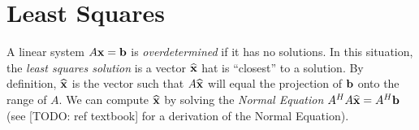 \section*{Least Squares}

A linear system $A{\bf x}={\bf b}$ is \emph{overdetermined} if it has no solutions. 
In this situation, the \emph{least squares solution} is a vector $\widehat{{\bf x}}$ hat is ``closest'' to a solution. 
By definition, $\widehat{{\bf x}}$ is the vector such that $A\widehat{{\bf x}}$ will equal the projection of ${\bf b}$ onto the range of $A$. 
We can compute $\widehat{{\bf x}}$ by solving the \emph{Normal Equation} $A^HA\widehat{{\bf x}} = A^H{\bf b}$ (see [TODO: ref textbook] for a derivation of the Normal Equation).

